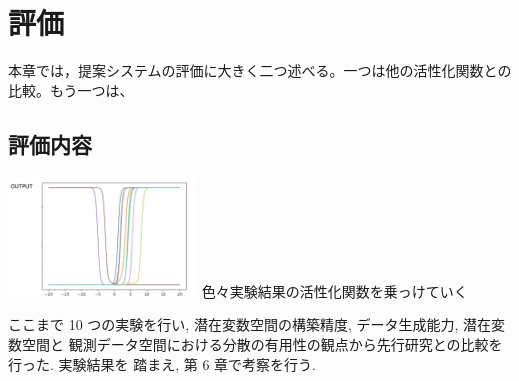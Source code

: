 \chapter{評価}
\label{evaluation}
本章では，提案システムの評価に大きく二つ述べる。一つは他の活性化関数との比較。もう一つは、

\section{評価内容}


\includegraphics[width=5cm]{asset/output.png}
色々実験結果の活性化関数を乗っけていく

ここまで 10 つの実験を行い, 潜在変数空間の構築精度, データ生成能力, 潜在変数空間と
観測データ空間における分散の有用性の観点から先行研究との比較を行った. 実験結果を
踏まえ, 第 6 章で考察を行う.




